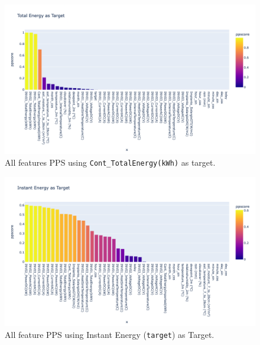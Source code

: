 %
\begin{figure}[H]
	\centering
	\includegraphics[width=.9\textwidth, keepaspectratio]{chapters/2_data_preprocessing/imgs/ppcontottenergy.png}
	\caption{All features PPS using \texttt{Cont\_TotalEnergy(kWh)} as target.}
	\label{fig:ppsTotEnergy}
\end{figure}


\begin{figure}[H]
	\centering
	\includegraphics[width=.9\textwidth, keepaspectratio]{chapters/2_data_preprocessing/imgs/pptarget.png}
	\caption{All feature PPS using Instant Energy (\texttt{target}) as Target.}
	\label{fig:ppstarget}
\end{figure}

